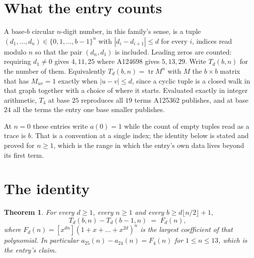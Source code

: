 \documentclass[11pt,a4paper]{article}
\theoremstyle{plain}
\newtheorem{theorem}{Theorem}
\theoremstyle{definition}
\begin{document}
\section{What the entry counts}

A base-$b$ circular $n$-digit number, in this family's sense, is a tuple
$(d_1,\dots,d_n)\in\{0,1,\dots,b-1\}^{n}$ with $|d_i-d_{i+1}|\le d$ for every $i$, indices
read modulo $n$ so that the pair $(d_n,d_1)$ is included. Leading zeros are counted: requiring
$d_1\ne0$ gives $4,11,25$ where A124698 gives $5,13,29$. Write $T_d(b,n)$ for the number of
them. Equivalently $T_d(b,n)=\operatorname{tr}M^{n}$ with $M$ the $b\times b$ matrix that has
$M_{uv}=1$ exactly when $|u-v|\le d$, since a cyclic tuple is a closed walk in that graph
together with a choice of where it starts. Evaluated exactly in integer arithmetic, $T_{4}$
at base $25$ reproduces all $19$ terms A125362 publishes, and at base $24$ all the
terms the entry one base smaller publishes.

At $n=0$ these entries write $a(0)=1$ while the count of empty tuples read as a trace is $b$.
That is a convention at a single index; the identity below is stated and proved for $n\ge1$,
which is the range in which the entry's own data lives beyond its first term.

\section{The identity}

\begin{theorem}
For every $d\ge1$, every $n\ge1$ and every $b\ge d\lfloor n/2\rfloor+1$,
\[
T_d(b,n)-T_d(b-1,n)\;=\;F_d(n),
\]
where $F_d(n)=[x^{dn}](1+x+\dots+x^{2d})^{n}$ is the largest coefficient of that
polynomial. In particular $a_{25}(n)-a_{24}(n)=F_{4}(n)$ for $1\le n\le13$, which
is the entry's claim.
\end{theorem}
\end{document}
